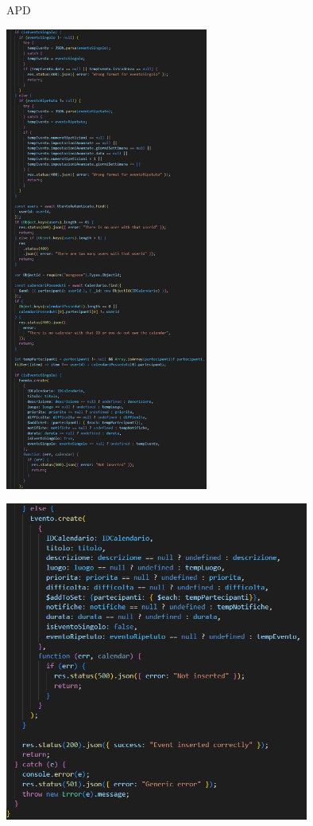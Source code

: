 \begin{listaPersonale} {APD}
\begin{listaPersonale2}[APD]{}
\begin{center}
                    \includegraphics[width=0.5\textwidth, height=0.9\textheight]{img/png/APIs/creaEvento2.png}
                \end{center}
                \begin{center}
                    \includegraphics[width=0.75\textwidth, height=0.6\textheight]{img/png/APIs/creaEvento3.png}

\end{center}
\end{listaPersonale2}
\end{listaPersonale}
